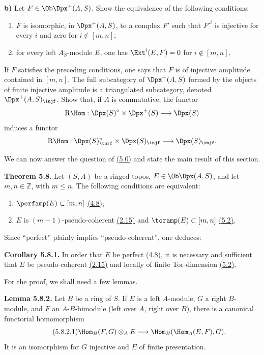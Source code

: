 \textbf{b)} Let \(F\in\Ob\Dpx^+(A,S)\)\textsuperscript{\thefootnote}. Show the equivalence of the following conditions:
\begin{enumerate}[label=(\roman*)]
\item \(F\) is isomorphic, in \(\Dpx^+(A,S)\), to a complex \(F'\) such that \(F'^i\) is injective for every \(i\) and zero for \(i\notin[m,n]\);
\item for every left \(A_S\)-module \(E\), one has \(\Ext^i(E,F)=0\) for \(i\notin[m,n]\).
\end{enumerate}
If \(F\) satisfies the preceding conditions, one says that \(F\) is of injective amplitude contained in \([m,n]\). The full subcategory of \(\Dpx^+(A,S)\) formed by the objects of finite injective amplitude is a triangulated subcategory, denoted \(\Dpx^+(A,S)_{\injf}\). Show that, if \(A\) is commutative, the functor
\[
  \mathrm R\Hom:\Dpx(S)^\circ\times\Dpx^+(S)\longrightarrow \Dpx(S)
\]
induces a functor
\[
  \mathrm R\Hom:\Dpx(S)^\circ_{\torf}\times\Dpx(S)_{\injf}
  \longrightarrow \Dpx(S)_{\injf}.
\]

We can now answer the question of \hyperlink{sga6.e01.para.5-0}{(5.0)} and state the main result of this section.

\textbf{Theorem 5.8.} Let \((S,A)\) be a ringed topos, \(E\in\Ob\Dpx(A,S)\), and let \(m,n\in\mathbb Z\), with \(m\leq n\). The following conditions are equivalent:
\begin{enumerate}[label=(\roman*)]
\item \(\perfamp(E)\subset[m,n]\) \hyperlink{sga6.e01.ex.4-8}{(4.8)};
\item \(E\) is \((m-1)\)-pseudo-coherent \hyperlink{sga6.e01.ex.2-15}{(2.15)} and \(\toramp(E)\subset[m,n]\) \hyperlink{sga6.e01.def.5-2}{(5.2)}.
\end{enumerate}
Since ``perfect'' plainly implies ``pseudo-coherent'', one deduces:

\textbf{Corollary 5.8.1.} In order that \(E\) be perfect \hyperlink{sga6.e01.ex.4-8}{(4.8)}, it is necessary and sufficient that \(E\) be pseudo-coherent \hyperlink{sga6.e01.ex.2-15}{(2.15)} and locally of finite Tor-dimension \hyperlink{sga6.e01.def.5-2}{(5.2)}.

For the proof, we shall need a few lemmas.

\textbf{Lemma 5.8.2.} Let \(B\) be a ring of \(S\). If \(E\) is a left \(A\)-module, \(G\) a right \(B\)-module, and \(F\) an \(A\)-\(B\)-bimodule (left over \(A\), right over \(B\)), there is a canonical functorial homomorphism
\begin{equation}\tag{5.8.2.1}
  \Hom_B(F,G)\otimes_A E
  \longrightarrow
  \Hom_B(\Hom_A(E,F),G).
\end{equation}
It is an isomorphism for \(G\) injective and \(E\) of finite presentation.

